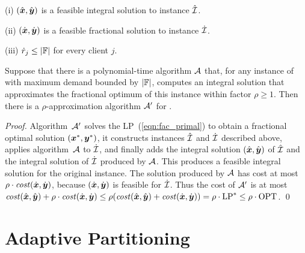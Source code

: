 \documentclass{llncs}
\begin{document}

\begin{lemma}\label{lem: polynomial demands partition}
{\rm (i)}
  $(\hat{\boldsymbol{x}}, \hat{\boldsymbol{y}})$ is a feasible integral solution to
  instance ${\hat{\cal I}}$.

\noindent
{\rm (ii)}
  $(\dot{\boldsymbol{x}}, \dot{\boldsymbol{y}})$ is a feasible fractional
  solution to instance ${\dot{\cal I}}$.

\noindent
{\rm (iii)}
${\dot r}_j\leq |\mathbb{F}|$ for every client $j$.

\end{lemma}



\begin{theorem}\label{thm: reduction to polynomial}
  Suppose that there is a polynomial-time algorithm ${\cal A}$
  that, for any instance of {\FTFP} with maximum demand
  bounded by $|\mathbb{F}|$, computes an integral solution
  that approximates the fractional optimum of this instance
  within factor $\rho\geq 1$.  Then there is a
  $\rho$-approximation algorithm ${\cal A}'$ for {\FTFP}.
\end{theorem}


\begin{proof}
  Algorithm~${\cal A}'$ solves the LP~(\ref{eqn:fac_primal}) to obtain a
  fractional optimal solution $(\boldsymbol{x}^\ast,\boldsymbol{y}^\ast)$, it constructs
  instances ${\hat{\cal I}}$ and ${\dot{\cal I}}$ described above,  applies
  algorithm~${\cal A}$ to ${\dot{\cal I}}$, and finally adds 
 the integral solution $(\hat{\boldsymbol{x}}, \hat{\boldsymbol{y}})$ of
  ${\hat{\cal I}}$ and the integral solution of ${\dot{\cal I}}$ produced
  by ${\cal A}$. This produces a feasible integral
  solution for the original instance. The solution produced by 
${\cal A}$ has cost at most
$\rho\cdot{\it cost}(\dot{\boldsymbol{x}},\dot{\boldsymbol{y}})$, because $(\dot{\boldsymbol{x}},\dot{\boldsymbol{y}})$
is feasible for ${\dot{\cal I}}$. Thus the cost of ${\cal A}'$ is at most
% 
$
 {\it cost}(\hat{\boldsymbol{x}}, \hat{\boldsymbol{y}}) + \rho\cdot{\it cost}(\dot{\boldsymbol{x}},\dot{\boldsymbol{y}})
	\le
 \rho({\it cost}(\hat{\boldsymbol{x}}, \hat{\boldsymbol{y}}) + {\it cost}(\dot{\boldsymbol{x}},\dot{\boldsymbol{y}}))
		= \rho\cdot\mbox{\rm LP}^\ast \le \rho\cdot\mbox{\rm OPT}
$. 
\qed
\end{proof}


\section{Adaptive Partitioning}
\label{sec: adaptive partitioning}
\end{document}
